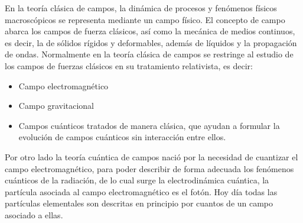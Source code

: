 \documentclass[a4paper,openright,12pt]{book}
\begin{document}
En la teoría clásica de campos, la dinámica de procesos y fenómenos físicos macroscópicos se representa mediante un campo físico. El concepto de campo abarca los campos de fuerza clásicos, así como la mecánica de medios continuos, es decir, la de sólidos rígidos y deformables, además de líquidos y la propagación de ondas. Normalmente en la teoría clásica de campos se restringe al estudio de los campos de fuerzas clásicos en su tratamiento relativista, es decir: 
\begin{itemize}
\item Campo electromagnético
\item Campo gravitacional
\item Campos cuánticos tratados de manera clásica, que ayudan a formular la evolución de campos cuánticos sin interacción entre ellos.
\end{itemize}

Por otro lado la teoría cuántica de campos nació por la necesidad de cuantizar el campo electromagnético, para poder describir de forma adecuada los fenómenos cuánticos de la radiación, de lo cual surge la electrodinámica cuántica, la partícula asociada al campo electromagnético es el fotón. Hoy día todas las partículas elementales son descritas en principio por cuantos de un campo asociado a ellas.
\end{document}
